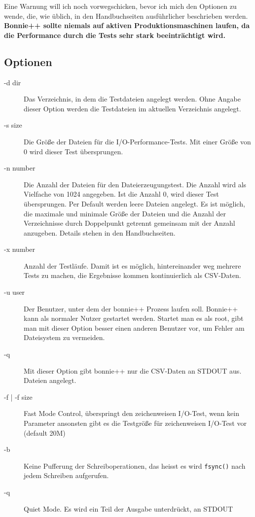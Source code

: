 \begin{normaltext}
  Eine Warnung will ich noch vorwegschicken, bevor ich mich den Optionen
  zu wende, die, wie üblich, in den Handbuchseiten ausführlicher beschrieben
  werden.
  {\bf Bonnie++ sollte niemals auf aktiven Produktionsmaschinen laufen, da die
  Performance durch die Tests sehr stark beeinträchtigt wird.}

  \subsection*{Optionen}
  \begin{description}
    \item[-d dir] Das Verzeichnis, in dem die Testdateien angelegt werden.
      Ohne Angabe dieser Option werden die Testdateien im aktuellen
      Verzeichnis angelegt.
    \item[-s size] Die Größe der Dateien für die I/O-Performance-Tests. Mit
      einer Größe von 0 wird dieser Test übersprungen.
    \item[-n number] Die Anzahl der Dateien für den Dateierzeugungstest. Die
      Anzahl wird als Vielfache von 1024 angegeben. Ist die Anzahl 0, wird
      dieser Test übersprungen. Per Default werden leere Dateien angelegt. Es
      ist möglich, die maximale und minimale Größe der Dateien und die Anzahl
      der Verzeichnisse durch Doppelpunkt getrennt gemeinsam mit der Anzahl
      anzugeben. Details stehen in den Handbuchseiten.
    \item[-x number] Anzahl der Testläufe. Damit ist es möglich,
      hintereinander weg mehrere Tests zu machen, die Ergebnisse kommen
      kontinuierlich als CSV-Daten.
    \item[-u user] Der Benutzer, unter dem der bonnie++ Prozess laufen soll.
      Bonnie++ kann als normaler Nutzer gestartet werden. Startet man es als
      root, gibt man mit dieser Option besser einen anderen Benutzer vor, um
      Fehler am Dateisystem zu vermeiden.
    \item[-q] Mit dieser Option gibt bonnie++ nur die CSV-Daten an STDOUT aus.
      Dateien angelegt.
    \item[-f | -f size] Fast Mode Control, überspringt den zeichenweisen
      I/O-Test, wenn kein Parameter ansonsten gibt es die Testgröße für
      zeichenweisen I/O-Test vor (default 20M)
    \item[-b] Keine Pufferung der Schreiboperationen, das heisst es wird
      \verb?fsync()? nach jedem Schreiben aufgerufen.
    \item[-q] Quiet Mode. Es wird ein Teil der Ausgabe unterdrückt, an STDOUT

\end{description}
\end{normaltext}

